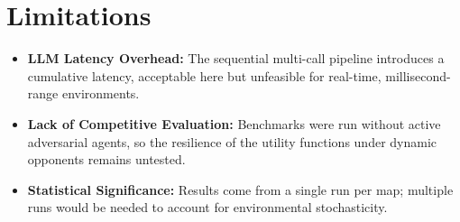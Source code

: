 \section{Limitations}
\begin{itemize}
  \item \textbf{LLM Latency Overhead:} The sequential multi-call pipeline introduces a cumulative latency, acceptable here but unfeasible for real-time, millisecond-range environments.
  \item \textbf{Lack of Competitive Evaluation:} Benchmarks were run without active adversarial agents, so the resilience of the utility functions under dynamic opponents remains untested.
  \item \textbf{Statistical Significance:} Results come from a single run per map; multiple runs would be needed to account for environmental stochasticity.
\end{itemize}